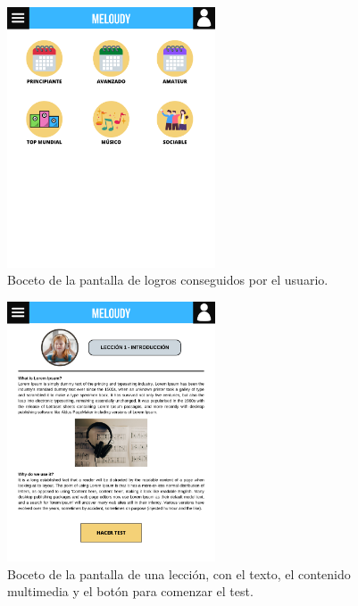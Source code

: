 \begin{figure}[H]
    \centering
    \centerline{\includegraphics[width=0.55\textwidth, frame]{imagenes/c6/3.png}}
    \caption{Boceto de la pantalla de logros conseguidos por el usuario.}
    \label{fig:logros}
    
    
\end{figure}


\begin{figure}[H]
    \centering
    \centerline{\includegraphics[width=0.55\textwidth, frame]{imagenes/c6/4.png}}
    \caption{Boceto de la pantalla de una lección, con el texto, el contenido multimedia y el botón para comenzar el test.}
    \label{fig:leccion}
\end{figure}

